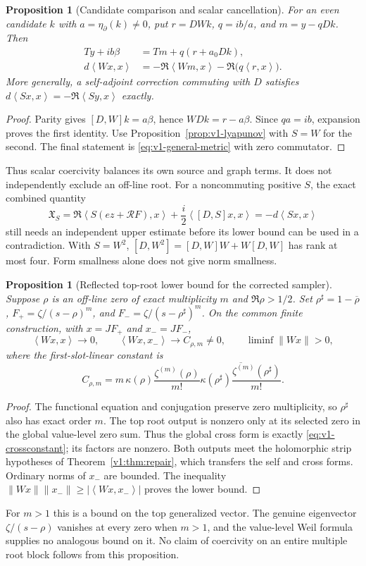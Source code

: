 \documentclass[11pt]{article}
\newtheorem{proposition}[theorem]{Proposition}
\theoremstyle{remark}
\newcommand{\ip}[2]{\left\langle #1,#2\right\rangle}
\begin{document}
\begin{proposition}[Candidate comparison and scalar cancellation]\label{prop:v1-candidate}
For an even candidate $k$ with $a=\eta_\partial(k)\ne0$, put
$r=DWk$, $q=ib/a$, and $m=y-qDk$. Then
\begin{align}
 T y+ib\beta&=T m+q(r+a_0Dk),\label{eq:v1-candidate}\\
 d\ip{Wx}{x}&=-\Re\ip{Wm}{x}-\Re\bigl(q\ip{r}{x}\bigr).
 \label{eq:v1-unshifted}
\end{align}
More generally, a self-adjoint correction commuting with $D$ satisfies
$d\ip{Sx}{x}=-\Re\ip{S y}{x}$ exactly.
\end{proposition}
\begin{proof}
Parity gives $[D,W]k=a\beta$, hence $WDk=r-a\beta$.
Since $qa=ib$, expansion proves the first identity. Use
Proposition~\ref{prop:v1-lyapunov} with $S=W$ for the second.
The final statement is \eqref{eq:v1-general-metric} with zero commutator.
\end{proof}
Thus scalar coercivity balances its own source and graph terms. It does
not independently exclude an off-line root. For a noncommuting positive
$S$, the exact combined quantity
\[
 \mathfrak X_S=\Re\ip{S(ez+\mathcal RF)}{x}
       +\frac i2\ip{[D,S]x}{x}=-d\ip{Sx}{x}
\]
still needs an independent upper estimate before its lower bound can be
used in a contradiction. With $S=W^2$, $[D,W^2]=[D,W]W+W[D,W]$ has
rank at most four. Form smallness alone does not give norm smallness.

\begin{proposition}[Reflected top-root lower bound for the corrected sampler]\label{prop:v1-reflected}
Suppose $\rho$ is an off-line zero of exact multiplicity $m$ and
$\Re\rho>1/2$. Set $\rho^\sharp=1-\overline\rho$,
$F_+=\zeta/(s-\rho)^m$, and $F_-=\zeta/(s-\rho^\sharp)^m$.
On the common finite construction, with $x=JF_+$ and $x_-=JF_-$,
\[
 \ip{Wx}{x}\to0,\qquad \ip{Wx}{x_-}\to C_{\rho,m}\ne0,
 \qquad \liminf\|Wx\|>0,
\]
where the first-slot-linear constant is
\begin{equation}\label{eq:v1-crossconstant}
 C_{\rho,m}=m\,\kappa(\rho)\frac{\zeta^{(m)}(\rho)}{m!}
 \overline{\kappa(\rho^\sharp)
                   \frac{\zeta^{(m)}(\rho^\sharp)}{m!}}.
\end{equation}
\end{proposition}
\begin{proof}
The functional equation and conjugation preserve zero multiplicity, so
$\rho^\sharp$ also has exact order $m$. The top root output is nonzero
only at its selected zero in the global value-level zero sum. Thus the
global cross form is exactly \eqref{eq:v1-crossconstant}; its factors
are nonzero. Both outputs meet the holomorphic strip hypotheses of
Theorem~\ref{v1:thm:repair}, which transfers the self and cross forms.
Ordinary norms of $x_-$ are bounded. The inequality
$\|Wx\|\|x_-\|\ge|\ip{Wx}{x_-}|$ proves the lower bound.
\end{proof}
For $m>1$ this is a bound on the top generalized vector. The genuine
eigenvector $\zeta/(s-\rho)$ vanishes at every zero when $m>1$, and the
value-level Weil formula supplies no analogous bound on it. No claim
of coercivity on an entire multiple root block follows from this proposition.
\end{document}
